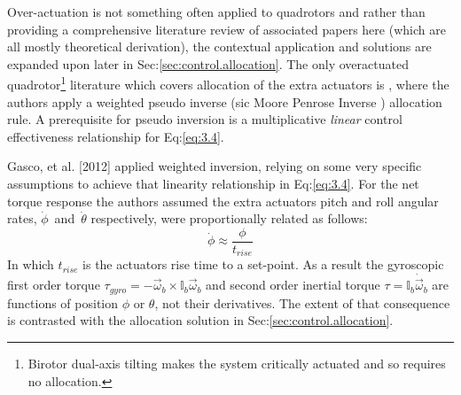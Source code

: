 \par
Over-actuation is not something often applied to quadrotors and rather than providing a comprehensive literature review of associated papers here (which are all mostly theoretical derivation), the contextual application and solutions are expanded upon later in Sec:\ref{sec:control.allocation}. The only overactuated quadrotor\footnote{Birotor dual-axis tilting makes the system critically actuated and so requires no allocation.} literature which covers allocation of the extra actuators is \cite{tiltgasco,tiltrihani}, where the authors apply a weighted pseudo inverse (sic Moore Penrose Inverse \cite{moorepenrose}) allocation rule. A prerequisite for pseudo inversion is a multiplicative \emph{linear} control effectiveness relationship for Eq:\ref{eq:3.4}. 
\par
Gasco, et al. [2012]\cite{tiltgasco,tiltrihani} applied weighted inversion, relying on some very specific assumptions to achieve that linearity relationship in Eq:\ref{eq:3.4}. For the net torque response the authors assumed the extra actuators pitch and roll angular rates, $\dot{\phi}$~and~$\dot{\theta}$ respectively, were proportionally related as follows:
\begin{equation}
\dot{\phi}\approx\frac{\phi}{t_{rise}}
\end{equation}
In which $t_{rise}$ is the actuators rise time to a set-point. As a result the gyroscopic first order torque $\tau_{gyro}=-\vec{\omega}_b\times\mathbb{I}_b\vec{\omega}_b$ and second order inertial torque $\tau=\mathbb{I}_b\dot{\vec{\omega}}_b$ are functions of position $\phi$ or $\theta$, not their derivatives. The extent of that consequence is contrasted with the allocation solution in Sec:\ref{sec:control.allocation}.
\vspace{-10pt}
